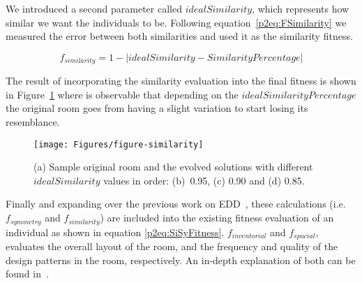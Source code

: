 


We introduced a second parameter called \(idealSimilarity\), which represents how similar we want the individuals to be. Following equation~\ref{p2eq:FSimilarity} we measured the error between both similarities and used it as the similarity fitness. 

\begin{equation} \label{p2eq:FSimilarity}
f_{similarity} = 1 - \left |idealSimilarity - SimilarityPercentage \right |
\end{equation}

The result of incorporating the similarity evaluation into the final fitness is shown in Figure~\ref{p2fig:similarity-result} where is observable that depending on the \(idealSimilarityPercentage\) the original room goes from having a slight variation to start losing its resemblance.

\begin{figure}
\texttt{[image: Figures/figure-similarity]}
\caption{(a) Sample original room and the evolved solutions with different \(idealSimilarity\) values in order: (b)~0.95, (c) 0.90 and (d) 0.85.}
\label{p2fig:similarity-result}
\end{figure}

Finally and expanding over the previous work on EDD~\cite{Baldwin2017TowardsGeneration}, these calculations (i.e. \(f_{symmetry}\) and \(f_{similarity}\)) are included into the existing fitness evaluation of an individual as shown in equation \ref{p2eq:SiSyFitness}. \(f_{inventorial}\) and \(f_{spacial}\), evaluates the overall layout of the room, and the frequency and quality of the design patterns in the room, respectively. An in-depth explanation of both can be found in~\cite{Baldwin2017TowardsGeneration}.


